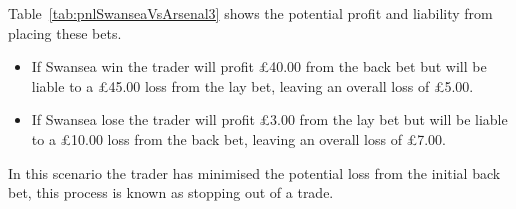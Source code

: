 	Table~\ref{tab:pnlSwanseaVsArsenal3} shows the potential profit and liability from placing these bets.

	\begin{itemize}
		\item If Swansea win the trader will profit \pounds40.00 from the back bet but will be liable to a \pounds45.00 loss from the lay bet, leaving an overall loss of \pounds5.00.
		\item If Swansea lose the trader will profit \pounds3.00 from the lay bet but will be liable to a \pounds10.00 loss from the back bet, leaving an overall loss of \pounds7.00.
	\end{itemize}
	
	In this scenario the trader has minimised the potential loss from the initial back bet, this process is known as stopping out of a trade.
	
	

